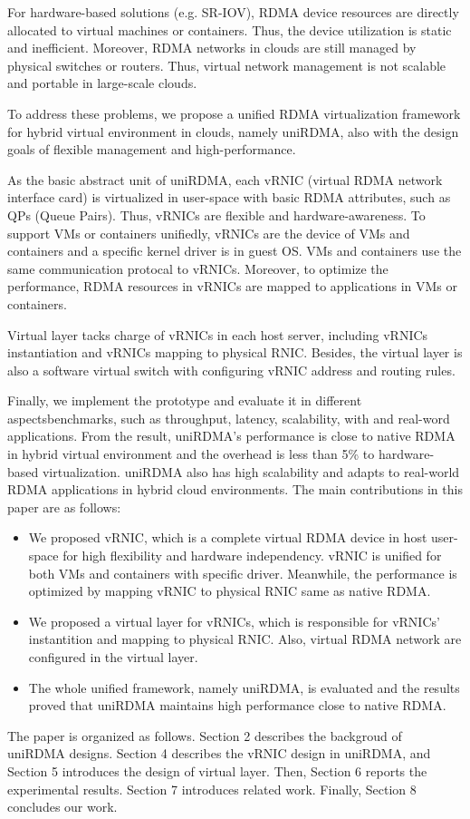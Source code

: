 For hardware-based solutions (e.g. SR-IOV), RDMA device resources are directly allocated to virtual machines or containers. Thus, the device utilization is static and inefficient. Moreover, RDMA networks in clouds are still managed by physical switches or routers. Thus, virtual network management is not scalable and portable in large-scale clouds.

To address these problems, we propose a unified RDMA virtualization framework for hybrid virtual environment in clouds, namely uniRDMA, also with the design goals of flexible management and high-performance. 

As the basic abstract unit of uniRDMA, each vRNIC (virtual RDMA network interface card) is virtualized in user-space with basic RDMA attributes, such as QPs (Queue Pairs). Thus, vRNICs are flexible and hardware-awareness. To support VMs or containers unifiedly, vRNICs are the device of VMs and containers and a specific kernel driver is in guest OS. VMs and containers use the same communication protocal to vRNICs. Moreover, to optimize the performance, RDMA resources in vRNICs are mapped to applications in VMs or containers. 

Virtual layer tacks charge of vRNICs in each host server, including vRNICs instantiation and vRNICs mapping to physical RNIC. Besides, the virtual layer is also a software virtual switch with configuring vRNIC address and routing rules. 

Finally, we implement the prototype and evaluate it in different aspectsbenchmarks, such as throughput, latency, scalability, with and real-word applications. From the result, uniRDMA's performance is close to native RDMA in hybrid virtual environment and the overhead is less than 5\% to hardware-based virtualization. uniRDMA also has high scalability and adapts to real-world RDMA applications in hybrid cloud environments. The main contributions in this paper are as follows:

\begin{itemize}
\item We proposed vRNIC, which is a complete virtual RDMA device in host user-space for high flexibility and hardware independency. vRNIC is unified for both VMs and containers with specific driver. Meanwhile, the performance is optimized by mapping vRNIC to physical RNIC same as native RDMA.

\item We proposed a virtual layer for vRNICs, which is responsible for vRNICs' instantition and mapping to physical RNIC. Also, virtual RDMA network are configured in the virtual layer.

\item The whole unified framework, namely uniRDMA, is evaluated and the results proved that uniRDMA maintains high performance close to native RDMA.
\end{itemize}

The paper is organized as follows. Section 2 describes the backgroud of uniRDMA designs. Section 4 describes the vRNIC design in uniRDMA, and Section 5 introduces the design of virtual layer. Then, Section 6 reports the experimental results. Section 7 introduces related work. Finally, Section 8 concludes our work.

